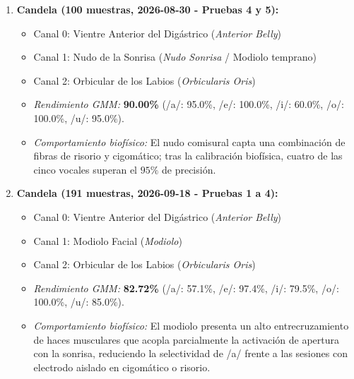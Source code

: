 \documentclass[11pt,a4paper]{article}
\begin{document}
\begin{enumerate}
    \item \textbf{Candela (100 muestras, 2026-08-30 - Pruebas 4 y 5):}
    \begin{itemize}
        \item Canal 0: Vientre Anterior del Digástrico (\textit{Anterior Belly})
        \item Canal 1: Nudo de la Sonrisa (\textit{Nudo Sonrisa} / Modiolo temprano)
        \item Canal 2: Orbicular de los Labios (\textit{Orbicularis Oris})
        \item \textit{Rendimiento GMM:} \textbf{90.00\%} (/a/: 95.0\%, /e/: 100.0\%, /i/: 60.0\%, /o/: 100.0\%, /u/: 95.0\%).
        \item \textit{Comportamiento biofísico:} El nudo comisural capta una combinación de fibras de risorio y cigomático; tras la calibración biofísica, cuatro de las cinco vocales superan el $95\%$ de precisión.
    \end{itemize}

    \item \textbf{Candela (191 muestras, 2026-09-18 - Pruebas 1 a 4):}
    \begin{itemize}
        \item Canal 0: Vientre Anterior del Digástrico (\textit{Anterior Belly})
        \item Canal 1: Modiolo Facial (\textit{Modiolo})
        \item Canal 2: Orbicular de los Labios (\textit{Orbicularis Oris})
        \item \textit{Rendimiento GMM:} \textbf{82.72\%} (/a/: 57.1\%, /e/: 97.4\%, /i/: 79.5\%, /o/: 100.0\%, /u/: 85.0\%).
        \item \textit{Comportamiento biofísico:} El modiolo presenta un alto entrecruzamiento de haces musculares que acopla parcialmente la activación de apertura con la sonrisa, reduciendo la selectividad de /a/ frente a las sesiones con electrodo aislado en cigomático o risorio.
    \end{itemize}


\end{enumerate}
\end{document}
